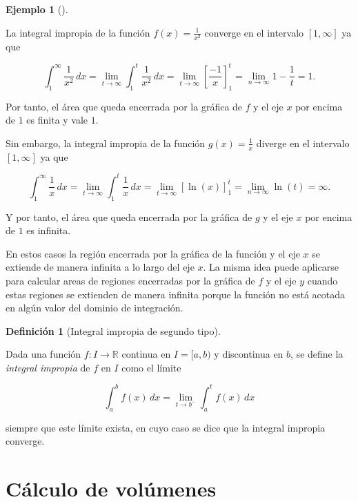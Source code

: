 \documentclass[
  a4paper,
]{scrreport}
\theoremstyle{definition}
\newtheorem{example}{Ejemplo}[chapter]
\theoremstyle{plain}
\theoremstyle{definition}
\newtheorem{definition}{Definición}[chapter]
\theoremstyle{definition}
\theoremstyle{plain}
\theoremstyle{plain}
\theoremstyle{remark}
\begin{document}
\begin{example}[]\protect\hypertarget{exm-integrales-impropias-1}{}\label{exm-integrales-impropias-1}

La integral impropia de la función \(f(x)=\frac{1}{x^2}\) converge en el
intervalo \([1,\infty]\) ya que

\[
\int_1^\infty \frac{1}{x^2}\,dx = \lim_{t\to\infty} \int_1^t \frac{1}{x^2}\,dx = \lim_{t\to\infty}\left[\frac{-1}{x}\right]_1^t = \lim_{n\to\infty} 1-\frac{1}{t} = 1.
\]

Por tanto, el área que queda encerrada por la gráfica de \(f\) y el eje
\(x\) por encima de \(1\) es finita y vale \(1\).

Sin embargo, la integral impropia de la función \(g(x)=\frac{1}{x}\)
diverge en el intervalo \([1,\infty]\) ya que

\[
\int_1^\infty \frac{1}{x}\,dx = \lim_{t\to\infty} \int_1^t \frac{1}{x}\,dx = \lim_{t\to\infty}\left[\ln(x)\right]_1^t = \lim_{n\to\infty} \ln(t) = \infty.
\]

Y por tanto, el área que queda encerrada por la gráfica de \(g\) y el
eje \(x\) por encima de \(1\) es infinita.

\end{example}

En estos casos la región encerrada por la gráfica de la función y el eje
\(x\) se extiende de manera infinita a lo largo del eje \(x\). La misma
idea puede aplicarse para calcular areas de regiones encerradas por la
gráfica de \(f\) y el eje \(y\) cuando estas regiones se extienden de
manera infinita porque la función no está acotada en algún valor del
dominio de integración.

\begin{definition}[Integral impropia de segundo
tipo]\protect\hypertarget{def-integral-impropia-2}{}\label{def-integral-impropia-2}

Dada una función \(f:I\to\mathbb{R}\) continua en \(I=[a,b)\) y
discontinua en \(b\), se define la \emph{integral impropia} de \(f\) en
\(I\) como el límite

\[
\int_a^b f(x)\,dx = \lim_{t\to b^-} \int_a^t f(x)\,dx
\]

siempre que este límite exista, en cuyo caso se dice que la integral
impropia converge.

\end{definition}

\section{Cálculo de volúmenes}\label{sec-calculo-volumenes-integral}
\end{document}
